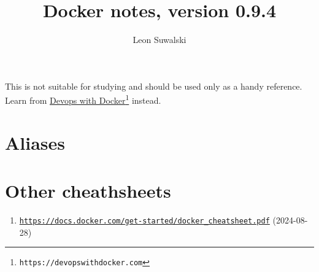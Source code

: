 \documentclass{charun}
\title{Docker notes, version 0.9.4}
\author{Leon Suwalski}
\begin{document}
\begin{multicols}{2}
\maketitle
\raggedright

This is not suitable for studying and should be used only as a handy reference.
Learn from \href{https://devopswithdocker.com}{\underline{Devops with Docker}}\footnote{\texttt{https://devopswithdocker.com}} instead.










\section{Aliases}


\section{Other cheathsheets}
\begin{enumerate}
    \item \footnotesize{\href{https://docs.docker.com/get-started/docker_cheatsheet.pdf}{\texttt{https://docs.docker.com/get-started/docker\_cheatsheet.pdf}} (2024-08-28)}
\end{enumerate}

\end{multicols}
\end{document}
